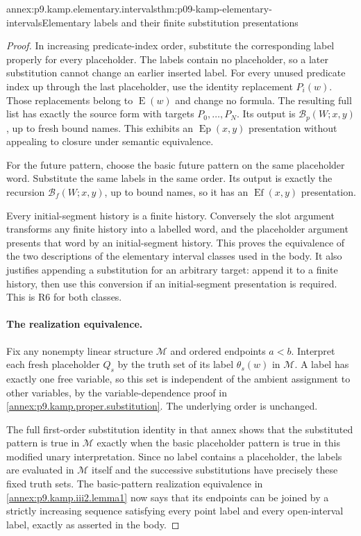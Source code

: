 \begin{annexitem}{annex:p9.kamp.elementary.intervals}{thm:p09-kamp-elementary-intervals}{Elementary labels and their finite substitution presentations}
\begin{proof}
In increasing predicate-index order, substitute the corresponding label
properly for every placeholder. The labels contain no placeholder, so
a later substitution cannot change an earlier inserted label. For every
unused predicate index up through the last placeholder, use the identity
replacement \(P_i(w)\). Those replacements belong to
\(\operatorname{E}(w)\) and change no formula. The resulting full
list has exactly the source form with targets \(P_0,\ldots,P_N\).
Its output is \(\mathcal B_p(W;x,y)\), up to fresh bound names.
This exhibits an \(\operatorname{Ep}(x,y)\) presentation without
appealing to closure under semantic equivalence.

For the future pattern, choose the basic future pattern on the same
placeholder word. Substitute the same labels in the same order. Its
output is exactly the recursion \(\mathcal B_f(W;x,y)\), up to
bound names, so it has an \(\operatorname{Ef}(x,y)\) presentation.

Every initial-segment history is a finite history. Conversely the
slot argument transforms any finite history into a labelled word, and
the placeholder argument presents that word by an initial-segment
history. This proves the equivalence of the two descriptions of the
elementary interval classes used in the body. It also justifies appending
a substitution for an arbitrary target: append it to a finite history,
then use this conversion if an initial-segment presentation is required.
This is R6 for both classes.

\paragraph{The realization equivalence.}
Fix any nonempty linear structure \(\mathcal M\) and ordered endpoints
\(a<b\). Interpret each fresh placeholder \(Q_s\) by the truth set
of its label \(\theta_s(w)\) in \(\mathcal M\). A label has exactly
one free variable, so this set is independent of the ambient assignment
to other variables, by the variable-dependence proof in
\cref{annex:p9.kamp.proper.substitution}. The underlying order is unchanged.

The full first-order substitution identity in that annex shows that the
substituted pattern is true in \(\mathcal M\) exactly when the basic
placeholder pattern is true in this modified unary interpretation.
Since no label contains a placeholder, the labels are evaluated in
\(\mathcal M\) itself and the successive substitutions have precisely
these fixed truth sets. The basic-pattern realization equivalence in
\cref{annex:p9.kamp.iii2.lemma1} now says that its endpoints can be
joined by a strictly increasing sequence satisfying every point label
and every open-interval label, exactly as asserted in the body.


\end{proof}
\end{annexitem}
